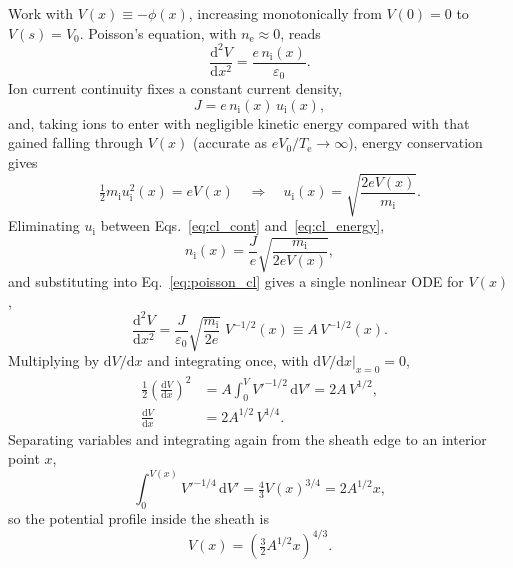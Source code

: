 Work with $V(x) \equiv -\phi(x)$, increasing monotonically from $V(0)=0$ to $V(s)=V_{0}$. Poisson's equation, with $n_{\mathrm{e}}\approx 0$, reads
\begin{equation}
\frac{\mathrm{d}^{2}V}{\mathrm{d}x^{2}} = \frac{e\,n_{\mathrm{i}}(x)}{\varepsilon_{0}}.
\label{eq:poisson_cl}
\end{equation}
Ion current continuity fixes a constant current density,
\begin{equation}
J = e\,n_{\mathrm{i}}(x)\,u_{\mathrm{i}}(x),
\label{eq:cl_cont}
\end{equation}
and, taking ions to enter with negligible kinetic energy compared with that gained falling through $V(x)$ (accurate as $eV_{0}/T_{\mathrm{e}} \to \infty$), energy conservation gives
\begin{equation}
\tfrac{1}{2}m_{\mathrm{i}}u_{\mathrm{i}}^{2}(x) = eV(x)
\quad\Longrightarrow\quad
u_{\mathrm{i}}(x) = \sqrt{\frac{2eV(x)}{m_{\mathrm{i}}}}.
\label{eq:cl_energy}
\end{equation}
Eliminating $u_{\mathrm{i}}$ between Eqs.~\eqref{eq:cl_cont} and~\eqref{eq:cl_energy},
\begin{equation}
n_{\mathrm{i}}(x) = \frac{J}{e}\sqrt{\frac{m_{\mathrm{i}}}{2eV(x)}},
\end{equation}
and substituting into Eq.~\eqref{eq:poisson_cl} gives a single nonlinear ODE for $V(x)$,
\begin{equation}
\frac{\mathrm{d}^{2}V}{\mathrm{d}x^{2}} = \frac{J}{\varepsilon_{0}}\sqrt{\frac{m_{\mathrm{i}}}{2e}}\;V^{-1/2}(x) \equiv A\,V^{-1/2}(x).
\label{eq:cl_ode}
\end{equation}
Multiplying by $\mathrm{d}V/\mathrm{d}x$ and integrating once, with $\mathrm{d}V/\mathrm{d}x\big|_{x=0}=0$,
\begin{align}
\frac{1}{2}\left(\frac{\mathrm{d}V}{\mathrm{d}x}\right)^{2} &= A\int_{0}^{V} V'^{-1/2}\,\mathrm{d}V' = 2A\,V^{1/2}, \\
\frac{\mathrm{d}V}{\mathrm{d}x} &= 2A^{1/2}\,V^{1/4}.
\label{eq:cl_first_int}
\end{align}
Separating variables and integrating again from the sheath edge to an interior point $x$,
\begin{equation}
\int_{0}^{V(x)} V'^{-1/4}\,\mathrm{d}V' = \tfrac{4}{3}V(x)^{3/4} = 2A^{1/2}x,
\end{equation}
so the potential profile inside the sheath is
\begin{equation}
V(x) = \left(\tfrac{3}{2}A^{1/2}x\right)^{4/3}.
\label{eq:cl_profile}
\end{equation}
